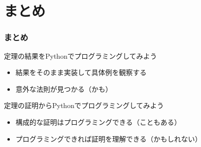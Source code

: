 \documentclass[dvipdfmx,11pt,notheorems]{beamer}
\theoremstyle{definition}
\begin{document}
\section{まとめ}

\begin{frame}\frametitle{まとめ}

\begin{block}{定理の結果をPythonでプログラミングしてみよう}
\begin{itemize}
\item 結果をそのまま実装して具体例を観察する
\item 意外な法則が見つかる（かも）
\end{itemize}
\end{block}


\begin{block}{定理の証明からPythonでプログラミングしてみよう}
\begin{itemize}
\item 構成的な証明はプログラミングできる（こともある）
\item プログラミングできれば証明を理解できる（かもしれない）
\end{itemize}
\end{block}

\end{frame}
\end{document}
